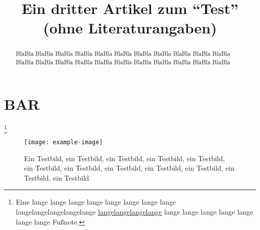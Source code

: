 \documentclass{dtk}
\begin{document}
\title{Ein dritter Artikel zum "`Test"' (ohne Literaturangaben)}

\maketitle

\begin{abstract}
BlaBla BlaBla BlaBla BlaBla BlaBla BlaBla BlaBla BlaBla BlaBla BlaBla BlaBla
BlaBla BlaBla BlaBla BlaBla BlaBla BlaBla BlaBla BlaBla BlaBla BlaBla BlaBla
\end{abstract}

\section{BAR}

\blindtext\footnote*{Eine lange lange lange lange lange lange lange lange
\mbox{langelangelangelangelange} \url{langelangelangelange} lange lange lange
lange lange lange lange
Fußnote.}%

\begin{figure}[!htp] \centering
  \texttt{[image: example-image]}
  \caption{Ein Testbild, ein Testbild, ein Testbild, ein Testbild, ein
  Testbild, ein Testbild, ein Testbild, ein Testbild, ein Testbild, ein
  Testbild, ein Testbild, ein Testbild}
\end{figure}
\end{document}
